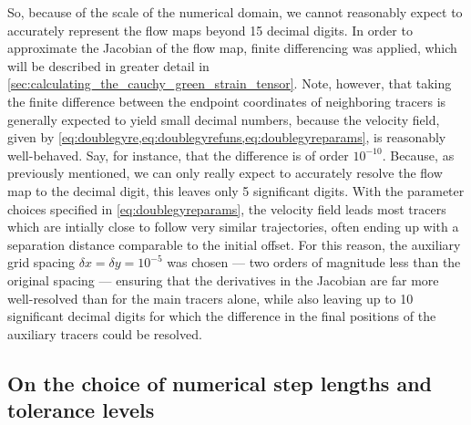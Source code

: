 So, because of the scale of the numerical domain, we cannot reasonably expect
to accurately represent the flow maps beyond 15 decimal digits. In order to
approximate the Jacobian of the flow map, finite differencing was applied,
which will be described in greater detail in
\cref{sec:calculating_the_cauchy_green_strain_tensor}. Note, however, that
taking the finite difference between the endpoint coordinates of neighboring
tracers is generally expected to yield small decimal numbers, because the
velocity field, given by
\cref{eq:doublegyre,eq:doublegyrefuns,eq:doublegyreparams}, is reasonably
well-behaved. Say, for instance, that the difference is of order $10^{-10}$.
Because, as previously mentioned, we can only really expect to accurately
resolve the flow map to the  decimal digit, this leaves only 5
significant digits. With the parameter choices specified in
\cref{eq:doublegyreparams}, the velocity field leads most tracers which
are intially close to follow very similar trajectories, often ending up
with a separation distance comparable to the initial offset. For this reason,
the auxiliary grid spacing $\delta{x}=\delta{y}=10^{-5}$ was chosen --- two
orders of magnitude less than the original spacing --- ensuring that the
derivatives in the Jacobian are far more well-resolved than for the main
tracers alone, while also leaving up to 10 significant decimal digits for
which the difference in the final positions of the auxiliary tracers could be
resolved.
\clearpage
%
\subsection{On the choice of numerical step lengths and tolerance levels}
\label{sub:on_the_choice_of_numerical_step_lengths_and_tolerance_levels}


